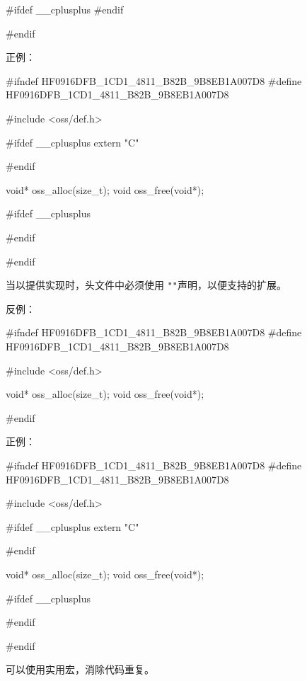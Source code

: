 \begin{content}
\begin{leftbar}
\begin{c++}[caption={\ttfamily{oss/oss\_memery.h}}]
{#ifdef  __cplusplus
}
#endif

#endif
\end{c++}
\end{leftbar}

正例：
\begin{leftbar}
\begin{c++}[caption={\ttfamily{oss/oss\_memery.h}}]
#ifndef HF0916DFB_1CD1_4811_B82B_9B8EB1A007D8
#define HF0916DFB_1CD1_4811_B82B_9B8EB1A007D8
    
#include <oss/def.h>

#ifdef  __cplusplus
extern "C" {
#endif

void* oss_alloc(size_t);
void  oss_free(void*);

#ifdef  __cplusplus
}
#endif

#endif
\end{c++}
\end{leftbar}

\begin{regulation}
当以提供实现时，头文件中必须使用
\texttt{"}\texttt{"}声明，以便支持的扩展。
\end{regulation}

反例：
\begin{leftbar}
\begin{c++}[caption={oss/oss\_memery.h}]
#ifndef HF0916DFB_1CD1_4811_B82B_9B8EB1A007D8
#define HF0916DFB_1CD1_4811_B82B_9B8EB1A007D8    

#include <oss/def.h>

void* oss_alloc(size_t);
void  oss_free(void*);

#endif
\end{c++}
\end{leftbar}

正例：
\begin{leftbar}
\begin{c++}[caption={oss/oss\_memery.h}]
#ifndef HF0916DFB_1CD1_4811_B82B_9B8EB1A007D8
#define HF0916DFB_1CD1_4811_B82B_9B8EB1A007D8    

#include <oss/def.h>

#ifdef  __cplusplus
extern "C" {
#endif

void* oss_alloc(size_t);
void  oss_free(void*);

#ifdef  __cplusplus
}
#endif

#endif
\end{c++}
\end{leftbar}

可以使用实用宏，消除代码重复。


\end{content}
